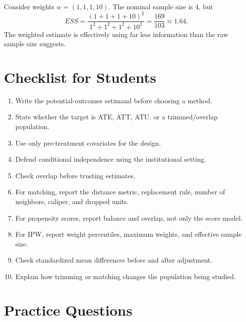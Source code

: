\begin{exmp}
Consider weights \(w=(1,1,1,10)\). The nominal sample size is 4, but
\[
    ESS=\frac{(1+1+1+10)^2}{1^2+1^2+1^2+10^2}
    =
    \frac{169}{103}
    \approx 1.64.
\]
The weighted estimate is effectively using far less information than the raw
sample size suggests.
\end{exmp}

\section{Checklist for Students}

\begin{enumerate}
    \item Write the potential-outcomes estimand before choosing a method.
    \item State whether the target is ATE, ATT, ATU, or a trimmed/overlap
    population.
    \item Use only pre-treatment covariates for the design.
    \item Defend conditional independence using the institutional setting.
    \item Check overlap before trusting estimates.
    \item For matching, report the distance metric, replacement rule, number of
    neighbors, caliper, and dropped units.
    \item For propensity scores, report balance and overlap, not only the score
    model.
    \item For IPW, report weight percentiles, maximum weights, and effective
    sample size.
    \item Check standardized mean differences before and after adjustment.
    \item Explain how trimming or matching changes the population being studied.
\end{enumerate}

\section{Practice Questions}

